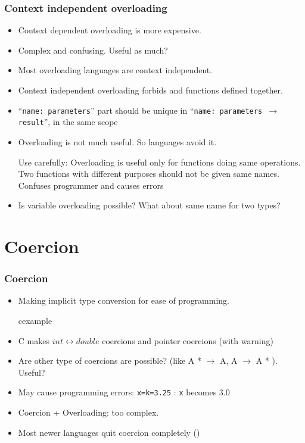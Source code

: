 \begin{frame}
\frametitle{Context independent overloading}
 \begin{itemize}
  \item Context dependent overloading is more expensive. 
  \item Complex and confusing. Useful as much?
  \item Most overloading languages are context independent.
  \item Context independent overloading forbids {\color{green!50!black}} and
  {\color{violet}} functions defined together.
  \item ``\texttt{name: parameters}'' part should be unique in 
  ``\texttt{\small name: parameters $\rightarrow$ result}'', in the same scope
\item Overloading is not much useful. So languages avoid it.
\begin{alertblock}{Use carefully:}
Overloading is useful only for functions doing same operations. Two functions with different
purposes should not be given same names. Confuses programmer and causes errors
\end{alertblock}
\item Is variable overloading possible? What about same name for two types?
\end{itemize}
\end{frame}

\section{Coercion}
\begin{frame}
\frametitle{Coercion}
 \begin{itemize}
  \item Making implicit type conversion for ease of programming.
\begin{beamercolorbox}{cexample}
\codecoerC
\end{beamercolorbox}
 \item C makes $int \leftrightarrow double$ coercions and pointer coercions (with warning)
 \item Are other type of coercions are possible? (like  A * $\rightarrow$ A, A $\rightarrow$ A *
 ). Useful?
 \item May cause programming errors: \texttt{x=k=3.25} : \texttt{x} becomes 3.0 
 \item Coercion + Overloading: too complex.
 \item Most newer languages quit coercion completely ()
 \end{itemize}
\end{frame}
